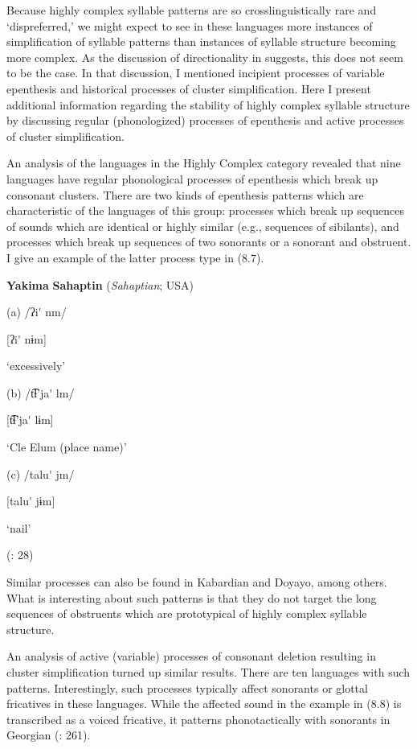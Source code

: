  Because highly complex syllable patterns are so crosslinguistically rare and ‘dispreferred,’ we might expect to see in these languages more instances of simplification of syllable patterns than instances of syllable structure becoming more complex. As the discussion of directionality in  suggests, this does not seem to be the case. In that discussion, I mentioned incipient processes of variable epenthesis and historical processes of cluster simplification. Here I present additional information regarding the stability of highly complex syllable structure by discussing regular (phonologized) processes of epenthesis and active processes of cluster simplification.

  An analysis of the languages in the Highly Complex category revealed that nine languages have regular phonological processes of epenthesis which break up consonant clusters. There are two kinds of epenthesis patterns which are characteristic of the languages of this group: processes which break up sequences of sounds which are identical or highly similar (e.g., sequences of sibilants), and processes which break up sequences of two sonorants or a sonorant and obstruent. I give an example of the latter process type in (8.7).

\ea\label{ex:(8.7)}
  \textbf{Yakima} \textbf{Sahaptin} (\textit{Sahaptian}; USA)

(a)  /ʔi\'{} nm/

  [ʔi\'{} nɨm]

  ‘excessively’

(b)  /t͡ɬ’ja\'{} lm/

  [t͡ɬ’ja\'{} lɨm]

  ‘Cle Elum (place name)’

(c)  /talu\'{} jm/

  [talu\'{} jɨm]

  ‘nail’

(\citealt{HargusBeavert2006}: 28)
\z

Similar processes can also be found in Kabardian and Doyayo, among others. What is interesting about such patterns is that they do not target the long sequences of obstruents which are prototypical of highly complex syllable structure.

  An analysis of active (variable) processes of consonant deletion resulting in cluster simplification turned up similar results. There are ten languages with such patterns. Interestingly, such processes typically affect sonorants or glottal fricatives in these languages. While the affected sound in the example in (8.8) is transcribed as a voiced fricative, it patterns phonotactically with sonorants in Georgian (\citealt{ShostedChikovani2006}: 261).

